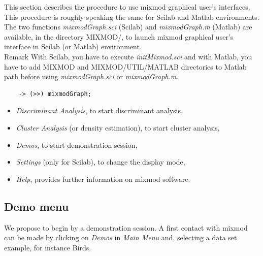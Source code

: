 This section describes the procedure to use {\sc mixmod} graphical user's interfaces. This procedure is roughly
speaking the same for Scilab and Matlab environments.
The two functions {\em mixmodGraph.sci} (Scilab) and {\em
mixmodGraph.m} (Matlab) are available, in the directory MIXMOD/, to launch {\sc mixmod} graphical
user's interface in Scilab (or Matlab) environment.\\

{\noindent Remark With Scilab, you have to execute {\em initMixmod.sci} and
with Matlab, you have to add {\sc MIXMOD} and {\sc MIXMOD/UTIL/MATLAB} directories to Matlab path before
using {\em mixmodGraph.sci} or {\em mixmodGraph.m}}.

{\scriptsize
\begin{verbatim}
    -> (>>) mixmodGraph;
\end{verbatim}}

\begin{itemize}
  \item {\em Discriminant Analysis}, to start discriminant analysis,
  \item {\em Cluster Analysis} (or density estimation), to start cluster analysis,
  \item {\em Demos}, to start demonstration session,
  \item {\em Settings} (only for Scilab), to change the display mode,
  \item {\em Help}, provides further information on {\sc mixmod} software.
\end{itemize}

\subsection{Demo menu}
We propose to begin by a demonstration session. A first contact
with {\sc mixmod} can be made by clicking on {\em Demos} in {\em Main Menu} and,
selecting a data set example, for instance Birds.%

